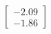 \documentclass[preview]{standalone}
\begin{document}
\begin{align*}
\begin{bmatrix} -2.09 \\ -1.86 \end{bmatrix}
\end{align*}
\end{document}
